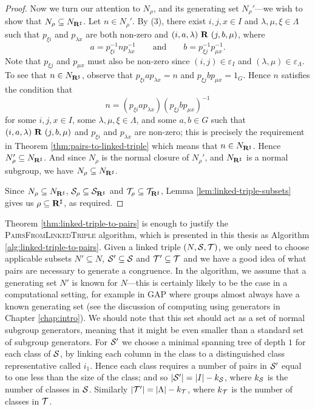 \begin{theorem}
\begin{proof}
    Now we turn our attention to $N_\rho$, and its generating set $N_\rho'$---we
    wish to show that $N_\rho \subseteq N_{\mathbf{R}^\sharp}$.  Let $n \in N_\rho'$.  By (3),
    there exist $i, j, x \in I$ and $\lambda, \mu, \xi \in \Lambda$ such that
    $p_{\xi i}$ and $p_{\lambda x}$ are both non-zero and
    $(i, a, \lambda) ~\mathbf{R}~ (j, b, \mu)$, where
    $$a = p_{\xi i}^{-1} n p_{\lambda x}^{-1} \qquad \text{and} \qquad
    b = p_{\xi j}^{-1} p_{\mu x}^{-1}.$$
    Note that $p_{\xi j}$ and $p_{\mu x}$
    must also be non-zero since $(i, j) \in \varepsilon_I$ and
    $(\lambda, \mu) \in \varepsilon_\Lambda$.  To see that $n \in N_{\mathbf{R}^\sharp}$, observe
    that $p_{\xi i} a p_{\lambda x} = n$ and $p_{\xi j} b p_{\mu x} = 1_G$.
    Hence $n$ satisfies the condition that
    $$n = (p_{\xi i} a p_{\lambda x}) (p_{\xi j} b p_{\mu x})^{-1}$$
    for some $i,j,x \in I$, some $\lambda, \mu, \xi \in \Lambda$, and some
    $a,b \in G$ such that $(i,a,\lambda) ~\mathbf{R}~ (j,b,\mu)$ and $p_{\xi i}$
    and $p_{\lambda x}$ are non-zero; this is precisely the requirement in
    Theorem \ref{thm:pairs-to-linked-triple} which means that $n \in N_{\mathbf{R}^\sharp}$.
    Hence $N_\rho' \subseteq N_{\mathbf{R}^\sharp}$.  And since $N_\rho$ is the normal closure of
    $N_\rho'$, and $N_{\mathbf{R}^\sharp}$ is a normal subgroup, we have $N_\rho \subseteq N_{\mathbf{R}^\sharp}$.

    Since $N_\rho \subseteq N_{\mathbf{R}^\sharp}$, $\mathcal{S}_\rho \subseteq \mathcal{S}_{\mathbf{R}^\sharp}$ and
    $\mathcal{T}_\rho \subseteq \mathcal{T}_{\mathbf{R}^\sharp}$, Lemma \ref{lem:linked-triple-subsets} gives us
    $\rho \subseteq \mathbf{R}^\sharp$, as required.
  \end{proof}
\end{theorem}

Theorem \ref{thm:linked-triple-to-pairs} is enough to justify the
\textsc{PairsFromLinkedTriple} algorithm, which is presented in this
thesis as Algorithm \ref{alg:linked-triple-to-pairs}.  Given a linked triple
$(N, \mathcal{S}, \mathcal{T})$, we only need to choose applicable subsets $N' \subseteq N$,
$\mathcal{S}' \subseteq \mathcal{S}$ and $\mathcal{T}' \subseteq \mathcal{T}$ and we have a
good idea of what pairs are necessary to generate a congruence.  In the
algorithm, we assume that a generating set $N'$ is known for $N$---this is
certainly likely to be the case in a computational setting, for example in GAP
\cite{gap} where groups almost always have a known generating set (see the
discussion of computing using generators in Chapter \ref{chap:intro}).  We should
note that this set should act as a set of normal subgroup generators, meaning
that it might be even smaller than a standard set of subgroup generators.  For
$\mathcal{S}'$ we choose a minimal spanning tree of depth $1$ for each class of $\mathcal{S}$, by linking
each column in the class to a distinguished class representative called $i_1$.
Hence each class requires a number of pairs in $\mathcal{S}'$ equal to one less than the
size of the class; and so $|\mathcal{S}'| = |I| - k_{\mathcal{S}}$, where $k_{\mathcal{S}}$ is the number
of classes in $\mathcal{S}$.  Similarly $|\mathcal{T}'| = |\Lambda| - k_{\mathcal{T}}$, where $k_{\mathcal{T}}$ is
the number of classes in $\mathcal{T}$.

